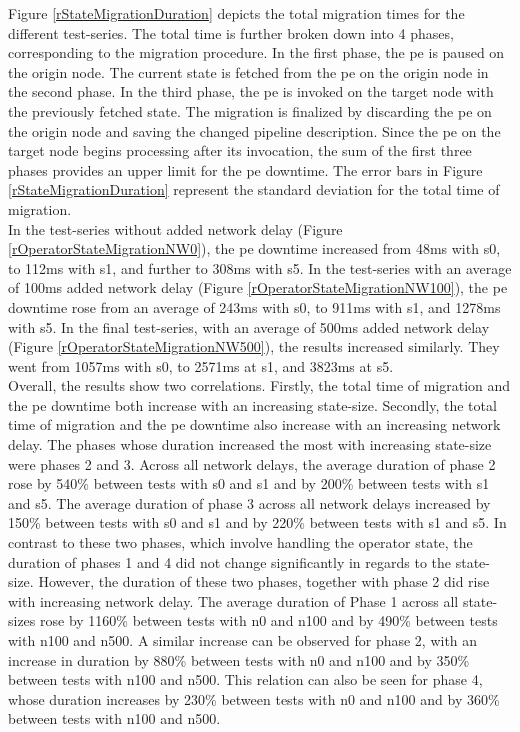 Figure \ref{rStateMigrationDuration} depicts the total migration times for the different test-series. The total time is further broken down into 4 phases, corresponding to the migration procedure. In the first phase, the \gls{pe} is paused on the origin node. The current state is fetched from the \gls{pe} on the origin node in the second phase. In the third phase, the \gls{pe} is invoked on the target node with the previously fetched state. The migration is finalized by discarding the \gls{pe} on the origin node and saving the changed pipeline description. Since the \gls{pe} on the target node begins processing after its invocation, the sum of the first three phases provides an upper limit for the \gls{pe} downtime. The error bars in Figure \ref{rStateMigrationDuration} represent the standard deviation for the total time of migration.\\ 
In the test-series without added network delay (Figure \ref{rOperatorStateMigrationNW0}), the \gls{pe} downtime increased from 48ms with s0, to 112ms with s1, and further to 308ms with s5. In the test-series with an average of 100ms added network delay (Figure \ref{rOperatorStateMigrationNW100}), the \gls{pe} downtime rose from an average of 243ms with s0, to 911ms with s1, and 1278ms with s5. In the final test-series, with an average of 500ms added network delay (Figure \ref{rOperatorStateMigrationNW500}), the results increased similarly. They went from 1057ms with s0, to 2571ms at s1, and 3823ms at s5.\\
Overall, the results show two correlations. Firstly, the total time of migration and the \gls{pe} downtime both increase with an increasing state-size. Secondly, the total time of migration and the \gls{pe} downtime also increase with an increasing network delay. The phases whose duration increased the most with increasing state-size were phases 2 and 3. Across all network delays, the average duration of phase 2 rose by 540\% between tests with s0 and s1 and by 200\% between tests with s1 and s5. The average duration of phase 3 across all network delays increased by 150\% between tests with s0 and s1 and by 220\% between tests with s1 and s5. In contrast to these two phases, which involve handling the operator state, the duration of phases 1 and 4 did not change significantly in regards to the state-size. However, the duration of these two phases, together with phase 2 did rise with increasing network delay. The average duration of Phase 1 across all state-sizes rose by 1160\% between tests with n0 and n100 and by 490\% between tests with n100 and n500. A similar increase can be observed for phase 2, with an increase in duration by 880\% between tests with n0 and n100 and by 350\% between tests with n100 and n500. This relation can also be seen for phase 4, whose duration increases by 230\% between tests with n0 and n100 and by 360\% between tests with n100 and n500.\par

